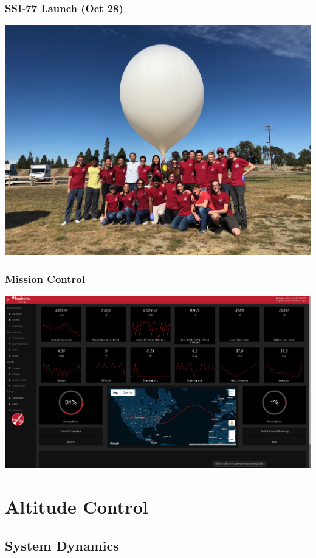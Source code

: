 \documentclass[10pt,mathserif]{beamer}
\begin{document}
\begin{frame}
\frametitle{SSI-77 Launch (Oct 28)}
\includegraphics[width=1\linewidth,trim={0 2cm 0 2cm},clip]{launch.jpg}
\end{frame}

\begin{frame}
\frametitle{Mission Control}
\hspace*{-1cm}\includegraphics[width=1.2\linewidth,trim={0 0cm 0 0cm},clip]{habmc.png}
\end{frame}

\section{Altitude Control}
\subsection{System Dynamics}
\end{document}
